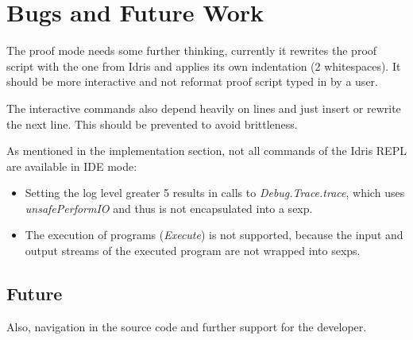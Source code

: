 \documentclass{article}
\begin{document}
\section{Bugs and Future Work}
The proof mode needs some further thinking, currently it rewrites the proof script with the one from Idris and applies its own indentation (2 whitespaces).
It should be more interactive and not reformat proof script typed in by a user.

The interactive commands also depend heavily on lines and just insert or rewrite the next line.
This should be prevented to avoid brittleness.

As mentioned in the implementation section, not all commands of the Idris REPL are available in IDE mode:
\begin{itemize}
\item Setting the log level greater 5 results in calls to \emph{Debug.Trace.trace}, which uses \emph{unsafePerformIO} and thus is not encapsulated into a sexp.
\item The execution of programs (\emph{Execute}) is not supported, because the input and output streams of the executed program are not wrapped into sexps.
\end{itemize}

\subsection{Future}

Also, navigation in the source code and further support for the developer.
\end{document}
